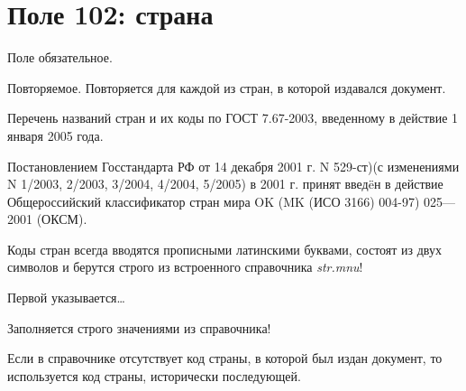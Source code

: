\chapter{Поле 102: страна}

Поле обязательное.

Повторяемое. Повторяется для каждой из стран, в которой издавался документ.

Перечень названий стран и их коды по ГОСТ 7.67-2003, введенному в действие 1 января 2005 года.

Постановлением Госстандарта РФ от 14 декабря 2001 г. N 529-ст)(с изменениями N 1/2003, 2/2003, 3/2004, 4/2004, 5/2005) в 2001 г. принят введ\"eн в действие Общероссийский классификатор стран мира OK (MK (ИСО 3166) 004-97) 025—2001 (ОКСМ).

Коды стран всегда вводятся прописными латинскими буквами, состоят из двух символов и берутся строго из встроенного справочника \emph{str.mnu}!

Первой указывается… %

Заполняется строго значениями из справочника!

Если в справочнике отсутствует код страны, в которой был издан документ, то используется код страны, исторически последующей.
